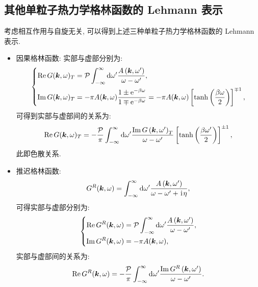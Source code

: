 \subsection{其他单粒子热力学格林函数的 Lehmann 表示}
考虑相互作用与自旋无关, 可以得到上述三种单粒子热力学格林函数的 Lehmann 表示.
\begin{itemize}
\item 因果格林函数:
实部与虚部分别为:
\begin{equation}
\left\{\begin{aligned}
\operatorname{Re} G(\boldsymbol{k}, \omega)_T&=\mathcal{P} \int_{-\infty}^{\infty} \mathrm{d} \omega^{\prime} \frac{A\left(\boldsymbol{k}, \omega^{\prime}\right)}{\omega-\omega^{\prime}} ,\\
\operatorname{Im} G(\boldsymbol{k}, \omega)_T&=-\pi A(\boldsymbol{k}, \omega) \frac{1 \pm \mathrm{e}^{- \beta\omega}}{1 \mp \mathrm{e}^{-\beta\omega}}=-\pi A(\boldsymbol{k}, \omega) \left[\tanh\left(\frac{\beta \omega}{2}\right)\right] ^{\mp 1},
\end{aligned}\right.
\end{equation}
可得到实部与虚部间的关系为:
\begin{equation}
\operatorname{Re} G(\boldsymbol{k}, \omega)_T=-\frac{\mathcal{P}}{\pi} \int_{-\infty}^{\infty} \mathrm{d} \omega^{\prime} \frac{\operatorname{Im} G\left(\boldsymbol{k}, \omega^{\prime}\right)_T}{\omega-\omega^{\prime}} \left[\tanh \left(\frac{\beta \omega^{\prime}}{2}\right)\right]^{\pm 1} ,
\end{equation}
此即色散关系.
\item 推迟格林函数:
\begin{equation}
 G^R(\boldsymbol{k}, \omega)=\int_{-\infty}^{\infty} \mathrm{d} \omega^{\prime} \frac{A\left(\boldsymbol{k}, \omega^{\prime}\right)}{\omega-\omega^{\prime}+\hspace{0.1em}\mathrm{i}\hspace{0.1em} \eta},
\end{equation}
可得实部与虚部分别为:
\begin{equation}
\left\{\begin{aligned}
\operatorname{Re} G^R(\boldsymbol{k}, \omega)&=\mathcal{P} \int_{-\infty}^{\infty} \mathrm{d} \omega^{\prime} \frac{A\left(\boldsymbol{k}, \omega^{\prime}\right)}{\omega-\omega^{\prime}},\\
\operatorname{Im} G^R(\boldsymbol{k}, \omega)&=-\pi A(\boldsymbol{k}, \omega) ,
\end{aligned}\right.
\end{equation}
实部与虚部间的关系为:
\begin{equation}
\operatorname{Re} G^R(\vct{k}, \omega)=-\frac{\mathcal{P}}{\pi} \int_{-\infty}^{\infty} \mathrm{d} \omega^{\prime} \frac{\operatorname{Im} G^R\left(\vct{k}, \omega^{\prime}\right)}{\omega-\omega^{\prime}} .

\end{equation}
\end{itemize}
